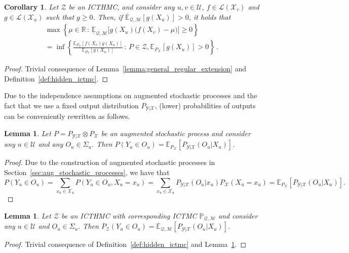 \documentclass[3p]{elsarticle}
\newtheorem{corollary}[theorem]{Corollary}
\newtheorem{lemma}[theorem]{Lemma}
\newcommand{\reals}{\mathbb{R}}
\newcommand{\states}{\mathcal{X}}
\newcommand{\observs}{\mathcal{Y}}
\newcommand{\lexp}{\underline{\mathbb{E}}_{\rateset,\mathcal{M}}}
\newcommand{\uexp}{\overline{\mathbb{E}}_{\rateset,\mathcal{M}}}
\newcommand{\gambles}{\mathcal{L}}
\newcommand{\rateset}{\mathcal{Q}}
\begin{document}
\begin{corollary}\label{cor:lower_hidden_is_root_chain}
Let $\mathcal{Z}$ be an ICTHMC, and consider any $u,v\in\mathcal{U}$, $f\in\gambles(\states_v)$ and $g\in\gambles(\states_u)$ such that $g\geq 0$. Then, if $\uexp[g(X_u)]>0$, it holds that
\begin{multline*}
\max\left\{\mu\in\reals\,:\, \lexp\bigl[g(X_u)\bigl(f(X_v) - \mu\bigr)\bigr] \geq 0\right\}\\ = \inf\left\{ \frac{\mathbb{E}_{P_\states}[f(X_v)g(X_u)]}{\mathbb{E}_{P_\states}[g(X_u)]}\,:\,P\in\mathcal{Z}, \mathbb{E}_{P_\states}[g(X_u)]>0 \right\}\,.
\end{multline*}
\end{corollary}
\begin{proof}
Trivial consequence of Lemma~\ref{lemma:general_regular_extension} and Definition~\ref{def:hidden_ictmc}.
\end{proof}

Due to the independence assumptions on augmented stochastic processes and the fact that we use a fixed output distribution $P_{\observs\vert\states}$, (lower) probabilities of outputs can be conveniently rewritten as follows.
\begin{lemma}\label{lemma:output_probability_is_expectation}
Let $P=P_{\observs\vert\states}\otimes P_\states$ be an augmented stochastic process and consider any $u\in\mathcal{U}$ and any $O_u\in\Sigma_u$. Then $P(Y_u\in O_u)=\mathbb{E}_{P_\states}[P_{\observs\vert\states}(O_u\vert X_u)]$.
\end{lemma}
\begin{proof}
Due to the construction of augmented stochastic processes in Section~\ref{sec:aug_stochastic_processes}, we have that
\begin{equation*}
P(Y_u\in O_u) = \sum_{x_u\in\states_u} P(Y_u\in O_u, X_u=x_u) 
 = \sum_{x_u\in\states_u} P_{\observs\vert\states}(O_u\vert x_u)P_\states(X_u=x_u) 
 = \mathbb{E}_{P_\states}[P_{\observs\vert\states}(O_u\vert X_u)].
\end{equation*}
\end{proof}
\begin{lemma}\label{lemma:lower_output_probability_is_expectation}
Let $\mathcal{Z}$ be an ICTHMC with corresponding ICTMC $\mathbb{P}_{\rateset,\mathcal{M}}$ and consider any $u\in\mathcal{U}$ and $O_u\in\Sigma_u$. Then $\overline{P}_{\mathcal{Z}}(Y_u\in O_u)=\uexp[P_{\observs\vert\states}(O_u\vert X_u)]$.
\end{lemma}
\begin{proof}
Trivial consequence of Definition~\ref{def:hidden_ictmc} and Lemma~\ref{lemma:output_probability_is_expectation}.
\end{proof}
\end{document}
